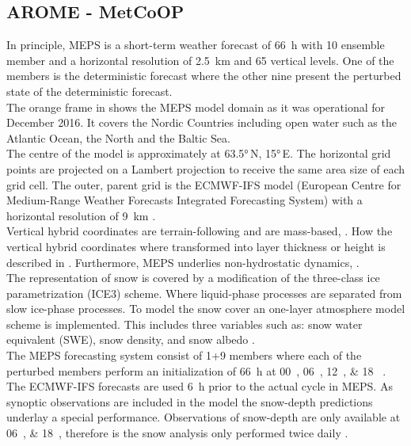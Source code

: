 \subsection{AROME - MetCoOP}
\label{sec:MEPS}
In principle, MEPS is a short-term weather forecast of \SI{66}{\hour} with 10 ensemble member and a horizontal resolution of \SI{2.5}{\km} and 65 vertical levels. One of the members is the deterministic forecast where the other nine present the perturbed state of the deterministic forecast.
\\
The orange frame in  shows the MEPS model domain as it was operational for December 2016. It covers the Nordic Countries including open water such as the Atlantic Ocean, the North and the Baltic Sea.  
\\
The centre of the model is approximately at \ang{63.5}\,N, \ang{15}\,E. 
The horizontal grid points are projected on a Lambert projection to receive the same area size of each grid cell. 
The outer, parent grid is the ECMWF-IFS model (European Centre for Medium-Range Weather Forecasts Integrated Forecasting System) with a horizontal resolution of \SI{9}{\km} \citep{homleid_verification_2016}. 
\\
Vertical hybrid coordinates are terrain-following and are mass-based, \citep{muller_arome-metcoop:_2017}. How the vertical hybrid coordinates where transformed into layer thickness or height is described in . Furthermore, MEPS underlies non-hydrostatic dynamics, \cite{metcoop_wiki_description_2017}.
\\
The representation of snow is covered by a modification of the three-class ice parametrization (ICE3) scheme. Where liquid-phase processes are separated from slow ice-phase processes. To model the snow cover an one-layer atmosphere model scheme is implemented. This includes three variables such as: snow water equivalent (SWE), snow density, and snow albedo \citep{muller_arome-metcoop:_2017}.
\\
The MEPS forecasting system consist of 1+9 members where each of the perturbed members perform an initialization of \SI{66}{\hour} at \SIlist{00;06;12;18}{\UTC} \citep{metcoop_wiki_description_2017}. The ECMWF-IFS forecasts are used \SI{6}{\hour} prior to the actual cycle in MEPS. As synoptic observations are included in the model the snow-depth predictions underlay a special performance. Observations of snow-depth are only available at \SIlist{06;18}{\UTC}, therefore is the snow analysis only performed twice daily \citep{muller_arome-metcoop:_2017, homleid_verification_2016}. 

